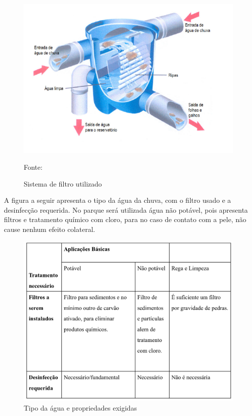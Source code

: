 \begin{figure}[H]
	\centering
	\label{SistemaDeFiltroUtilizado}
		\includegraphics[keepaspectratio=true,scale=0.8]{figuras/SistemaDeFiltroUtilizado.png}
	\caption{Sistema de filtro utilizado}
	\small{Fonte:  \cite{TECHINIK}}
\end{figure}
 
A figura a seguir apresenta o tipo da \'agua da chuva, com o filtro usado e a desinfec\c{c}\~ao requerida. No parque ser\'a utilizada \'agua n\~ao pot\'avel, pois apresenta filtros e tratamento qu\'imico com cloro, para no caso de contato com a pele, n\~ao cause nenhum efeito colateral.
 
\begin{figure}[H]
	\centering
	\label{TipoAguaPropriedadesExigidas}
		\includegraphics[keepaspectratio=true,scale=0.8]{figuras/TipoAguaPropriedadesExigidas.png}
	\caption{Tipo da \'agua e propriedades exigidas}
\end{figure}
 
